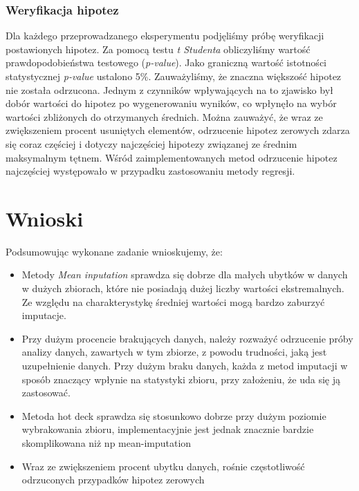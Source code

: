 \documentclass{classrep}
\begin{document}
{        \subsubsection{Weryfikacja hipotez}
        \label{summary:hypothesis} {
            Dla każdego przeprowadzanego eksperymentu podjęliśmy próbę weryfikacji postawionych hipotez. Za pomocą testu \textit{t Studenta} obliczyliśmy wartość prawdopodobieństwa testowego (\textit{p-value}). Jako graniczną wartość istotności statystycznej \textit{p-value} ustalono 5\%. Zauważyliśmy, że znaczna większość hipotez nie została odrzucona. Jednym z czynników wpływających na to zjawisko był dobór wartości do hipotez po wygenerowaniu wyników, co wpłynęło na wybór wartości zbliżonych do otrzymanych średnich. Można zauważyć, że wraz ze zwiększeniem procent usuniętych elementów, odrzucenie hipotez zerowych zdarza się coraz częściej i dotyczy najczęściej hipotezy związanej ze średnim maksymalnym tętnem. Wśród zaimplementowanych metod odrzucenie hipotez najczęściej występowało w przypadku zastosowaniu metody regresji. 
        }
    }

    \section{Wnioski}
    \label{conclusions} {
        Podsumowując wykonane zadanie wnioskujemy, że:
        \begin{itemize}
            \item Metody \textit{Mean inputation} sprawdza się dobrze dla małych ubytków
            w danych w dużych zbiorach, które nie posiadają dużej liczby wartości
            ekstremalnych. Ze względu na charakterystykę średniej wartości mogą bardzo
            zaburzyć imputacje.
            \item Przy dużym procencie brakujących danych, należy rozważyć odrzucenie próby analizy danych, zawartych w tym zbiorze, z powodu trudności, jaką jest uzupełnienie danych. Przy dużym braku danych, każda z metod imputacji w sposób znaczący wpłynie na statystyki zbioru, przy założeniu, że uda się ją zastosować.
            \item Metoda hot deck sprawdza się stosunkowo dobrze przy dużym poziomie wybrakowania zbioru, implementacyjnie jest jednak znacznie bardzie skomplikowana niż np mean-imputation
            \item Wraz ze zwiększeniem procent ubytku danych, rośnie częstotliwość odrzuconych przypadków hipotez zerowych
        \end{itemize}
    }

    \begin{thebibliography}{0}
    \end{thebibliography}
\end{document}
